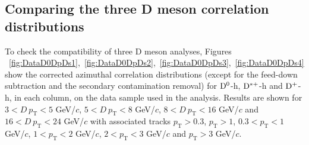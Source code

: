 \label{results}
\subsection{Comparing the three D meson correlation distributions}
To check the compatibility of three D meson analyses, Figures ~\ref{fig:DataD0DpDs1},~\ref{fig:DataD0DpDs2},~\ref{fig:DataD0DpDs3},~\ref{fig:DataD0DpDs4} show the corrected azimuthal correlation distributions (except for the feed-down subtraction and the secondary contamination removal) for ${\rm D^0}$-h, ${\rm D^{*+}}$-h and ${\rm D^+}$-h, in each column, on the data sample used in the analysis. Results are shown for $3 < D\ p_\text{T} < 5$ GeV/$c$, $5 < D\ p_\text{T} < 8$ GeV/$c$, $8 < D \ p_\text{T} < 16$ GeV/$c$ and $16 < D\ p_\text{T} < 24$ GeV/$c$ with associated tracks $p_\text{T} > 0.3$, $p_\text{T} > 1$, $0.3 < p_\text{T} < 1$ GeV/$c$, $1 < p_\text{T} < 2$ GeV/$c$, $2 < p_\text{T} < 3$ GeV/$c$ and $ p_\text{T} > 3$ GeV/$c$.

